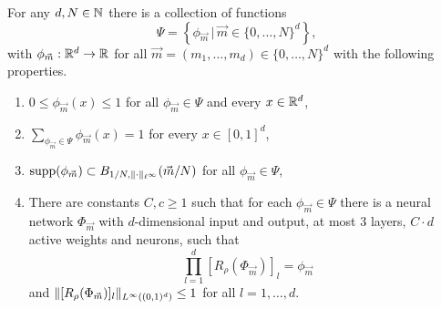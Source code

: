 \begin{lemma} \label{lemma: partition of unity}
    For any $d, N \in \mathbb{N}$ there is a collection of functions
    \begin{equation*}
        \Psi = \left\{ \phi_{\vec{m}} \, \vert \, \vec{m} \in \{ 0, \dots, N \}^d \right\},
    \end{equation*}
    with $\phi_{\vec{m}}: \mathbb{R}^d \to \mathbb{R}$ for all $\vec{m} = (m_1, \dots, m_d) \in \{ 0, \dots, N \}^d$ with the following properties.
    \begin{enumerate}
        \item $0 \leq \phi_{\vec{m}}(x) \leq 1$ for all $\phi_{\vec{m}} \in \Psi$ and every $x \in \mathbb{R}^d$,
        \item $\sum_{\phi_{\vec{m}} \in \Psi} \phi_{\vec{m}}(x) = 1$ for every $x \in [0,1]^d$,
        \item $\text{supp}(\phi_{\vec{m}}) \subset B_{1/N, \lVert \cdot \rVert_{\ell^\infty}}(\vec{m} / N)$ for all $\phi_{\vec{m}} \in \Psi$,
        \item There are constants $C, c \geq 1$ such that for each $\phi_{\vec{m}} \in \Psi$ there is a neural network
        $\Phi_{\vec{m}}$ with $d$-dimensional input and output, at most $3$ layers, $C \cdot d$ active weights and neurons,
        such that
        \begin{equation*}
            \prod_{l=1}^d [R_\rho(\Phi_{\vec{m}})]_l = \phi_{\vec{m}}
        \end{equation*}
        and $\lVert [R_\rho(\Phi_{\vec{m}})]_l \rVert_{L^\infty((0,1)^d)} \leq 1$ for all $l = 1, \dots, d$.
    \end{enumerate}
\end{lemma}
